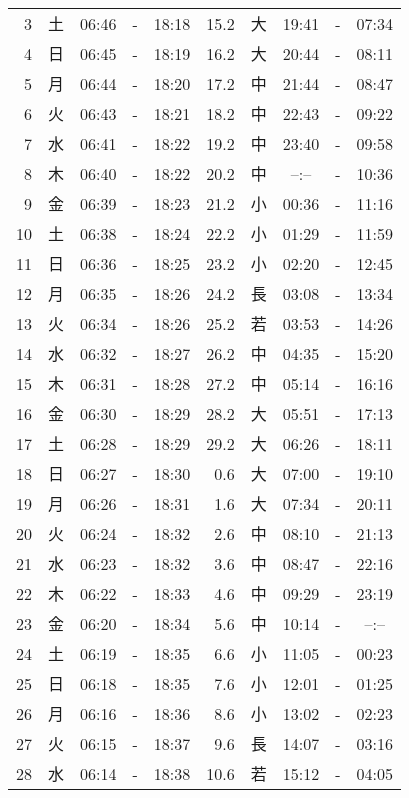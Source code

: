 \documentclass[a4j,10pt]{jsarticle}
\begin{document}
\begin{center}
\begin{table}[ht]
\begin{center}
\begin{tabular}{|rc|ccc|rc|ccc|}
  3 & 土 & 06:46 &-& 18:18 & 15.2 & 大 & 19:41 &-& 07:34 \\
  4 & 日 & 06:45 &-& 18:19 & 16.2 & 大 & 20:44 &-& 08:11 \\
  5 & 月 & 06:44 &-& 18:20 & 17.2 & 中 & 21:44 &-& 08:47 \\
  6 & 火 & 06:43 &-& 18:21 & 18.2 & 中 & 22:43 &-& 09:22 \\
  7 & 水 & 06:41 &-& 18:22 & 19.2 & 中 & 23:40 &-& 09:58 \\
  8 & 木 & 06:40 &-& 18:22 & 20.2 & 中 & --:-- &-& 10:36 \\
  9 & 金 & 06:39 &-& 18:23 & 21.2 & 小 & 00:36 &-& 11:16 \\
 10 & 土 & 06:38 &-& 18:24 & 22.2 & 小 & 01:29 &-& 11:59 \\
 11 & 日 & 06:36 &-& 18:25 & 23.2 & 小 & 02:20 &-& 12:45 \\
 12 & 月 & 06:35 &-& 18:26 & 24.2 & 長 & 03:08 &-& 13:34 \\
 13 & 火 & 06:34 &-& 18:26 & 25.2 & 若 & 03:53 &-& 14:26 \\
 14 & 水 & 06:32 &-& 18:27 & 26.2 & 中 & 04:35 &-& 15:20 \\
 15 & 木 & 06:31 &-& 18:28 & 27.2 & 中 & 05:14 &-& 16:16 \\
 16 & 金 & 06:30 &-& 18:29 & 28.2 & 大 & 05:51 &-& 17:13 \\
 17 & 土 & 06:28 &-& 18:29 & 29.2 & 大 & 06:26 &-& 18:11 \\
 18 & 日 & 06:27 &-& 18:30 &  0.6 & 大 & 07:00 &-& 19:10 \\
 19 & 月 & 06:26 &-& 18:31 &  1.6 & 大 & 07:34 &-& 20:11 \\
 20 & 火 & 06:24 &-& 18:32 &  2.6 & 中 & 08:10 &-& 21:13 \\
 21 & 水 & 06:23 &-& 18:32 &  3.6 & 中 & 08:47 &-& 22:16 \\
 22 & 木 & 06:22 &-& 18:33 &  4.6 & 中 & 09:29 &-& 23:19 \\
 23 & 金 & 06:20 &-& 18:34 &  5.6 & 中 & 10:14 &-& --:-- \\
 24 & 土 & 06:19 &-& 18:35 &  6.6 & 小 & 11:05 &-& 00:23 \\
 25 & 日 & 06:18 &-& 18:35 &  7.6 & 小 & 12:01 &-& 01:25 \\
 26 & 月 & 06:16 &-& 18:36 &  8.6 & 小 & 13:02 &-& 02:23 \\
 27 & 火 & 06:15 &-& 18:37 &  9.6 & 長 & 14:07 &-& 03:16 \\
 28 & 水 & 06:14 &-& 18:38 & 10.6 & 若 & 15:12 &-& 04:05 \\

\end{tabular}
\end{center}
\end{table}
\end{center}
\end{document}
